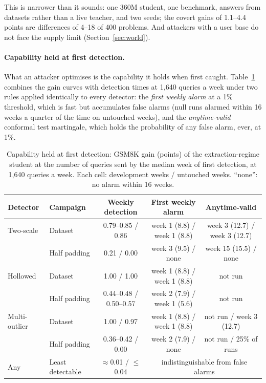 
This is narrower than it sounds: one 360M student, one benchmark, answers from datasets rather than a live teacher, and two seeds; the covert gains of 1.1--4.4 points are differences of 4--18 of 400 problems. And attackers with a user base do not face the supply limit (Section~\ref{sec:world}).

\paragraph{Capability held at first detection.} What an attacker optimises is the capability it holds when first caught. Table~\ref{tab:timefrontier} combines the gain curves with detection times at 1{,}640 queries a week under two rules applied identically to every detector: the \emph{first weekly alarm} at a 1\% threshold, which is fast but accumulates false alarms (null runs alarmed within 16 weeks a quarter of the time on untouched weeks), and the \emph{anytime-valid} conformal test martingale, which holds the probability of any false alarm, ever, at 1\%.

\begin{table}[t]
\caption{Capability held at first detection: GSM8K gain (points) of the extraction-regime student at the number of queries sent by the median week of first detection, at 1{,}640 queries a week. Each cell: development weeks / untouched weeks. ``none'': no alarm within 16 weeks.}
\label{tab:timefrontier}
\begin{center}
\footnotesize\setlength{\tabcolsep}{3.5pt}
\begin{tabular}{llccc}
\toprule
Detector & Campaign & Weekly detection & First weekly alarm & Anytime-valid \\
\midrule
Two-scale & Dataset & 0.79--0.85 / 0.86 & week 1 (8.8) / week 1 (8.8) & week 3 (12.7) / week 3 (12.7) \\
 & Half padding & 0.21 / 0.00 & week 3 (9.5) / none & week 15 (15.5) / none \\
Hollowed & Dataset & 1.00 / 1.00 & week 1 (8.8) / week 1 (8.8) & not run \\
 & Half padding & 0.44--0.48 / 0.50--0.57 & week 2 (7.9) / week 1 (5.6) & not run \\
Multi-outlier & Dataset & 1.00 / 0.97 & week 1 (8.8) / week 1 (8.8) & not run / week 3 (12.7) \\
 & Half padding & 0.36--0.42 / 0.00 & week 2 (7.9) / none & not run / 25\% of runs \\
Any & Least detectable & $\approx$0.01 / $\le$0.04 & \multicolumn{2}{c}{indistinguishable from false alarms} \\
\bottomrule
\end{tabular}
\end{center}
\end{table}


